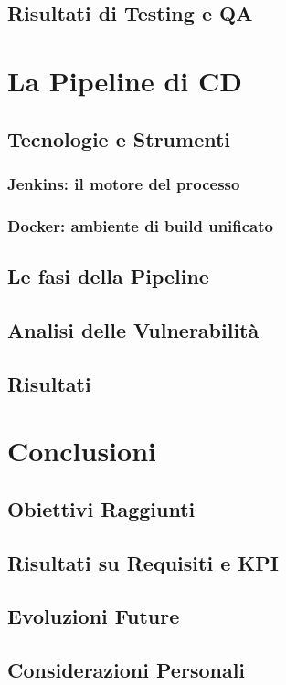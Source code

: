 \documentclass[a4paper,12pt]{report}
\begin{document}
	\section{Risultati di Testing e QA}
	
	\chapter{La Pipeline di CD}
	
	\section{Tecnologie e Strumenti}
	
	\subsection{Jenkins: il motore del processo}
	
	\subsection{Docker: ambiente di build unificato}
	
	\section{Le fasi della Pipeline}
	
	\section{Analisi delle Vulnerabilità}
	
	\section{Risultati}
	
	\chapter{Conclusioni}
	
	\section{Obiettivi Raggiunti}
	
	\section{Risultati su Requisiti e KPI}
	
	\section{Evoluzioni Future}
	
	\section{Considerazioni Personali}
	
\end{document}
